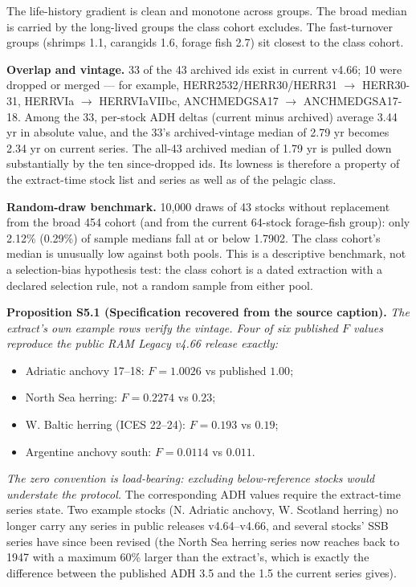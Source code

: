 \documentclass[11pt]{article}
\begin{document}
The life-history gradient is clean and monotone across groups. The broad median is carried by the long-lived groups the class cohort excludes. The fast-turnover groups (shrimps 1.1, carangids 1.6, forage fish 2.7) sit closest to the class cohort.

\textbf{Overlap and vintage.} 33 of the 43 archived ids exist in current v4.66; 10 were dropped or merged --- for example, HERR2532/HERR30/HERR31 \(\to\) HERR30-31, HERRVIa \(\to\) HERRVIaVIIbc, ANCHMEDGSA17 \(\to\) ANCHMEDGSA17-18. Among the 33, per-stock ADH deltas (current minus archived) average 3.44 yr in absolute value, and the 33's archived-vintage median of 2.79 yr becomes 2.34 yr on current series. The all-43 archived median of 1.79 yr is pulled down substantially by the ten since-dropped ids. Its lowness is therefore a property of the extract-time stock list and series as well as of the pelagic class.

\textbf{Random-draw benchmark.} 10,000 draws of 43 stocks without replacement from the broad 454 cohort (and from the current 64-stock forage-fish group): only 2.12\% (0.29\%) of sample medians fall at or below 1.7902. The class cohort's median is unusually low against both pools. This is a descriptive benchmark, not a selection-bias hypothesis test: the class cohort is a dated extraction with a declared selection rule, not a random sample from either pool.

\textbf{Proposition S5.1 (Specification recovered from the source caption).} \emph{The extract's own example rows verify the vintage. Four of six published \(F\) values reproduce the public RAM Legacy v4.66 release exactly:}

\begin{itemize}\setlength{\itemsep}{2pt}
\item Adriatic anchovy 17--18: \(F = 1.0026\) vs published \(1.00\);
\item North Sea herring: \(F = 0.2274\) vs \(0.23\);
\item W. Baltic herring (ICES 22--24): \(F = 0.193\) vs \(0.19\);
\item Argentine anchovy south: \(F = 0.0114\) vs \(0.011\).
\end{itemize}

\emph{The zero convention is load-bearing: excluding below-reference stocks would understate the protocol.} The corresponding ADH values require the extract-time series state. Two example stocks (N. Adriatic anchovy, W. Scotland herring) no longer carry any series in public releases v4.64--v4.66, and several stocks' SSB series have since been revised (the North Sea herring series now reaches back to 1947 with a maximum 60\% larger than the extract's, which is exactly the difference between the published ADH 3.5 and the 1.5 the current series gives).
\end{document}
